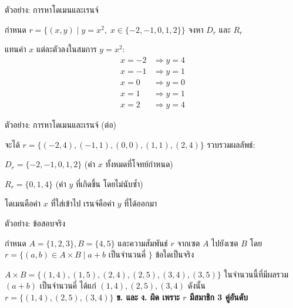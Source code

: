 \documentclass[11pt, aspectratio=169]{beamer}
\begin{document}
\begin{frame}{ตัวอย่าง: การหาโดเมนและเรนจ์}
  \begin{exambox}[โจทย์]
    กำหนด $r = \{(x, y) \mid y = x^2,\; x \in \{-2, -1, 0, 1, 2\}\}$
    จงหา $D_r$ และ $R_r$
  \end{exambox}

  \begin{solbox}[วิธีทำ]
    แทนค่า $x$ แต่ละตัวลงในสมการ $y = x^2$:
    \begin{align*}
      x = -2 &\Rightarrow y = 4 \\
      x = -1 &\Rightarrow y = 1 \\
      x = 0  &\Rightarrow y = 0 \\
      x = 1  &\Rightarrow y = 1 \\
      x = 2  &\Rightarrow y = 4
    \end{align*}
  \end{solbox}
\end{frame}

\begin{frame}{ตัวอย่าง: การหาโดเมนและเรนจ์ (ต่อ)}
  \begin{solbox}[วิธีทำ (ต่อ)]
    จะได้ $r = \{(-2,4), (-1,1), (0,0), (1,1), (2,4)\}$ \newline
    รวบรวมผลลัพธ์:

    $D_r = \{-2, -1, 0, 1, 2\}$ \quad (ค่า $x$ ทั้งหมดที่โจทย์กำหนด)

    $R_r = \{0, 1, 4\}$ \quad (ค่า $y$ ที่เกิดขึ้น โดยไม่นับซํ้า)
  \end{solbox}

  \medskip
  \begin{intuition}[สังเกต]
    โดเมนคือค่า $x$ ที่ใส่เข้าไป เรนจ์คือค่า $y$ ที่ได้ออกมา
  \end{intuition}
\end{frame}

\begin{frame}{ตัวอย่าง: ข้อสอบจริง}
  \begin{exambox}[โจทย์ปี 68 ข้อ 10]
    กำหนด $A=\{1,2,3\}, B=\{4,5\}$ และความสัมพันธ์ $r$ จากเซต $A$ ไปยังเซต $B$ โดย $r=\{(a,b)\in A\times B\mid a+b$ เป็นจำนวนคี่ $\}$ ข้อใดเป็นจริง 
  \end{exambox}

  \begin{solbox}[วิธีทำ]
    $A\times B = \{(1,4), (1,5), (2,4), (2,5), (3,4), (3,5)\}$ \newline
    ในจำนวนนี้ที่มีผลรวม $(a+b)$ เป็นจำนวนคี่ ได้แก่ $(1,4), (2,5), (3,4)$ \newline
    ดังนั้น $r = \{(1,4), (2,5), (3,4)\}$ \newline
    \textbf{ข. และ ง. ผิด เพราะ $r$ มีสมาชิก 3 คู่อันดับ}
  \end{solbox}
\end{frame}
\end{document}
